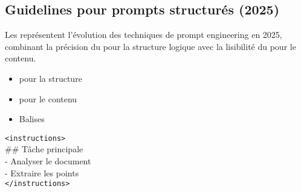 
\newcommand{\xmlopen}[1]{\texttt{\textcolor{myblue}{<#1>}}}
\newcommand{\xmlclose}[1]{\texttt{\textcolor{myblue}{</#1>}}}
\newcommand{\xmltagsimple}[1]{\texttt{<#1>}}

\newcommand{\xmltagname}[1]{\texttt{\detokenize{#1}}}

\subsection{Guidelines pour prompts structurés (2025)}

\begin{Definition}
    Les  représentent l'évolution des techniques de prompt engineering en 2025, combinant la précision du  pour la structure logique avec la lisibilité du  pour le contenu.
\end{Definition}

\begin{Methode}
    \begin{tcbraster}[raster columns=2]
        \begin{tcolorbox}[title=Principe fondamental]
            \begin{itemize}[label=$\bullet$]
                \item {} pour la structure
                \item {} pour le contenu
                \item Balises 
            \end{itemize}
        \end{tcolorbox}
        \begin{tcolorbox}[title=Exemple, colback=gray!5]
            \ttfamily\small
            \xmlopen{instructions}\\
            \hspace{1em}\#\# Tâche principale\\
            \hspace{1em}- Analyser le document\\
            \hspace{1em}- Extraire les points\\
            \xmlclose{instructions}
        \end{tcolorbox}
    \end{tcbraster}
\end{Methode}


